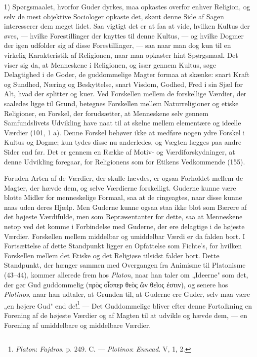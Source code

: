 \documentclass[12pt,a4paper]{book}
\newcommand{\opage}[1]{\marginnote{\footnotesize\textit{[#1]}}}
\newcommand{\apage}[1]{\marginnote{\footnotesize\textit{[#1]}}}
\begin{document}
1) Spørgsmaalet, hvorfor Guder dyrkes, maa opkastes overfor enhver Religion, og selv de mest
objektive Sociologer opkaste det, skønt denne Side af Sagen interesserer \apage{386} dem meget lidet. Saa
vigtigt det er at faa at vide, hvilken Kultus der øves, --- hvilke Forestillinger der knyttes
til denne Kultus, --- og hvilke Dogmer der igen udfolder sig af disse Forestillinger, --- saa
naar man dog kun til en virkelig Karakteristik af Religionen, naar man opkaster hint
Spørgsmaal. Det viser sig da, at Menneskene i Religionen, og især gennem Kultus, søge
Delagtighed i de Goder, de guddommelige Magter formaa at skænke: snart Kraft og Sundhed,
Næring og Beskyttelse, snart Visdom, Godhed, Fred i sin Sjæl for Alt, hvad der splitter og
kuer. Ved Forskellen mellem de forskellige Værdier, der saaledes ligge til Grund, betegnes
Forskellen mellem Naturreligioner og etiske Religioner, en Forskel, der forudsætter, at
Menneskene selv gennem Samfundslivets Udvikling have naat til at skelne mellem elementære og
ideelle Værdier (101, 1 a). Denne Forskel behøver ikke at medføre nogen ydre Forskel i Kultus
og Dogme; kun tydes disse nu anderledes, og Vægten lægges paa andre Sider end før. Det er
gennem en Række af Motiv- og Værdiforskydninger, at denne Udvikling foregaar, for Religionens
som for Etikens Vedkommende (155).

Foruden Arten af de Værdier, der skulle hævdes, er ogsaa Forholdet mellem de Magter, der
hævde dem, og selve Værdierne forskelligt. Guderne kunne være blotte Midler for menneskelige
Formaal, saa at de ringeagtes, naar disse kunne naas uden deres Hjælp. Men Guderne kunne
ogsaa staa ikke blot som Bærere af det højeste Værdifulde, men som Repræsentanter for dette,
saa at Menneskene netop ved det komme i Forbindelse med Guderne, der ere delagtige i de
højeste Værdier. Forskellen mellem middelbar og umiddelbar Værdi er da falden bort. I
Fortsættelse af dette Standpunkt ligger en Opfattelse som Fichte's, for hvilken Forskellen
mellem det Etiske og det Religiøse tilsidst falder bort. Dette Standpunkt, der hænger sammen
med Overgangen fra Animisme til Platonisme (43--44), kommer allerede frem hos \emph{Platon},
naar han taler om „Ideerne" som det, der gør Gud guddommelig (πρὸς οἷσπερ θεὸς ὢν θεῖος
ἐστιν), \opage{387} og senere hos \emph{Plotinos}, naar han udtaler, at Grunden til, at Guderne ere
Guder, selv maa være „en højere Gud" end de!\footnote{\emph{Platon}: \emph{Fajdros}. p. 249.
C. --- \emph{Plotinos}: \emph{Ennead}. V, 1, 2.} --- Det Guddommelige bliver efter denne
Fortolkning en Forening af de højeste Værdier og af Magten til at udvikle og hævde dem, --- en
Forening af umiddelbare og middelbare Værdier.
\end{document}
